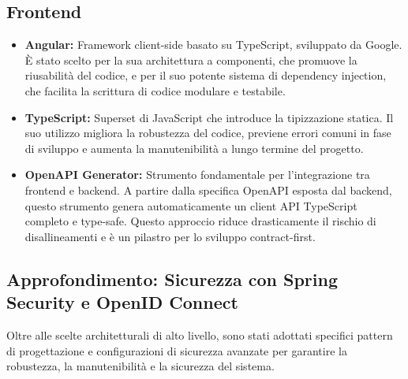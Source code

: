 \subsection{Frontend}
\begin{itemize}
	\item \textbf{Angular:} Framework client-side basato su TypeScript, sviluppato da Google. È stato scelto per la sua architettura a componenti, che promuove la riusabilità del codice, e per il suo potente sistema di dependency injection, che facilita la scrittura di codice modulare e testabile.

	\item \textbf{TypeScript:} Superset di JavaScript che introduce la tipizzazione statica. Il suo utilizzo migliora la robustezza del codice, previene errori comuni in fase di sviluppo e aumenta la manutenibilità a lungo termine del progetto.

	\item \textbf{OpenAPI Generator:} Strumento fondamentale per l'integrazione tra frontend e backend. A partire dalla specifica OpenAPI esposta dal backend, questo strumento genera automaticamente un client API TypeScript completo e type-safe. Questo approccio riduce drasticamente il rischio di disallineamenti e è un pilastro per lo sviluppo contract-first.
\end{itemize}

\subsection{Approfondimento: Sicurezza con Spring Security e OpenID Connect}

Oltre alle scelte architetturali di alto livello, sono stati adottati specifici pattern di progettazione e configurazioni di sicurezza avanzate per garantire la robustezza, la manutenibilità e la sicurezza del sistema.

